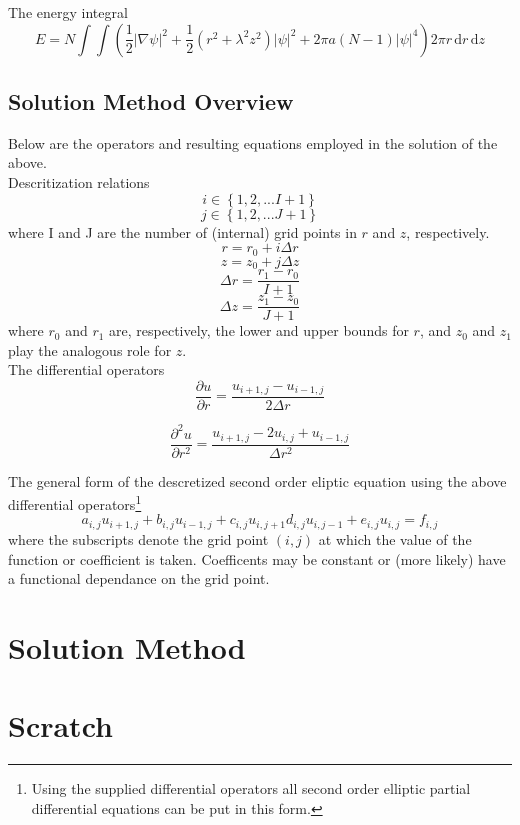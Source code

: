 \documentclass{article}
\begin{document}
The energy integral
\begin{equation}
E = N \int \int \left(
	\frac{1}{2} \lvert \nabla \psi \rvert^{2} + 
	\frac{1}{2} \left( r^{2} + \lambda^{2} z^{2} \right) \lvert \psi \rvert^{2} +
	2 \pi a (N-1) \lvert \psi \rvert^{4}
	\right) 2 \pi r \, \mathrm{d} r \, \mathrm{d}z
\end{equation}

\subsection{Solution Method Overview}
Below are the operators and resulting equations employed in the solution of the above.\\

Descritization relations
\begin{equation}
i \in \left \{ 1, 2, ... I+1 \right \}
\end{equation}
\begin{equation}
j \in \left \{ 1, 2, ... J+1 \right \}
\end{equation}
where I and J are the number of (internal) grid points in $r$ and
$z$, respectively.
\begin{equation}
r = r_{0} + i \Delta r
\end{equation}
\begin{equation}
z = z_{0} + j \Delta z
\end{equation}
\begin{equation}
\Delta r = \frac{r_{1}-r_{0}}{I+1}
\end{equation}
\begin{equation}
\Delta z = \frac{z_{1}-z_{0}}{J+1}
\end{equation}
where $r_0$  and $r_1$ are, respectively, the lower and upper bounds for $r$,
and $z_0$ and $z_1$ play the analogous role for $z$.\\

The differential operators
\begin{equation}
\frac{\partial u}{\partial r} = \frac{u_{i+1, j} - u_{i-1, j}}{2\Delta r}
\end{equation}

\begin{equation}
\frac{\partial^{2} u}{\partial r^{2}} =
\frac{u_{i+1,j} - 2 u_{i,j} +u_{i-1,j}}{\Delta r^{2}}
\end{equation}

The general form of the descretized second order eliptic equation using the
above differential operators\footnote{Using the supplied differential operators
all second order elliptic partial differential equations can be put in this
form.}
\begin{equation}
a_{i,j} u_{i+1, j} + b_{i,j} u_{i-1, j} + c_{i,j} u_{i, j+1} d_{i,j} u_{i, j-1}
+ e_{i,j} u_{i, j} = f_{i,j}
\end{equation}
where the subscripts denote the grid point $(i,j)$ at which the value of the
function or coefficient is taken. Coefficents may be constant or (more likely)
have a functional dependance on the grid point.

\section{Solution Method}

\section{Scratch}
\end{document}
